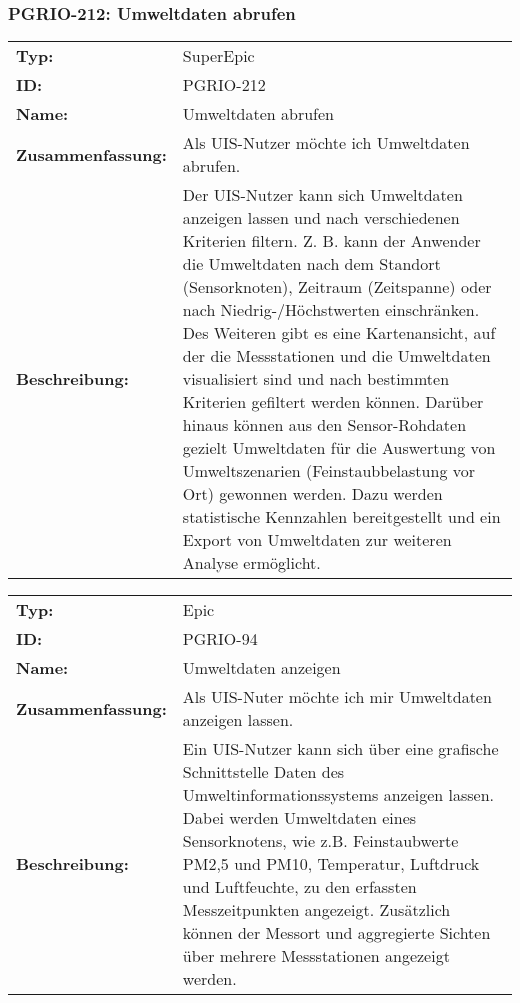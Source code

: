 \subsubsection{PGRIO-212: Umweltdaten abrufen} 
\begin{flushleft} 
\begin{tabular}{@{}lp{100mm}} 
\textbf{Typ:} & SuperEpic \\ 
\textbf{ID:} & PGRIO-212 \\ 
\textbf{Name:} & Umweltdaten abrufen \\ 
\textbf{Zusammenfassung:} & Als UIS-Nutzer möchte ich Umweltdaten abrufen. \\ 
\textbf{Beschreibung:} & Der UIS-Nutzer kann sich Umweltdaten anzeigen lassen und nach verschiedenen Kriterien filtern. Z. B. kann der Anwender die Umweltdaten nach dem Standort (Sensorknoten), Zeitraum (Zeitspanne) oder nach Niedrig-/Höchstwerten einschränken. Des Weiteren gibt es eine Kartenansicht, auf der die Messstationen und die Umweltdaten visualisiert sind und nach bestimmten Kriterien gefiltert werden können. Darüber hinaus können aus den Sensor-Rohdaten gezielt Umweltdaten für die Auswertung von Umweltszenarien (Feinstaubbelastung vor Ort) gewonnen werden. Dazu werden statistische Kennzahlen bereitgestellt und ein Export von Umweltdaten zur weiteren Analyse ermöglicht. \\ 
\end{tabular} 
\end{flushleft} 

		\begin{flushleft} 
\begin{tabular}{@{}lp{100mm}} 
\textbf{Typ:} & Epic \\ 
\textbf{ID:} & PGRIO-94 \\ 
\textbf{Name:} & Umweltdaten anzeigen \\ 
\textbf{Zusammenfassung:} & Als UIS-Nuter möchte ich mir Umweltdaten anzeigen lassen. \\ 
\textbf{Beschreibung:} & Ein UIS-Nutzer kann sich über eine grafische Schnittstelle Daten des Umweltinformationssystems anzeigen lassen. Dabei werden Umweltdaten eines Sensorknotens, wie z.B. Feinstaubwerte PM2,5 und PM10, Temperatur, Luftdruck und Luftfeuchte, zu den erfassten Messzeitpunkten angezeigt. Zusätzlich können der Messort und aggregierte Sichten über mehrere Messstationen angezeigt werden. \\ 
\end{tabular} 
\end{flushleft} 

